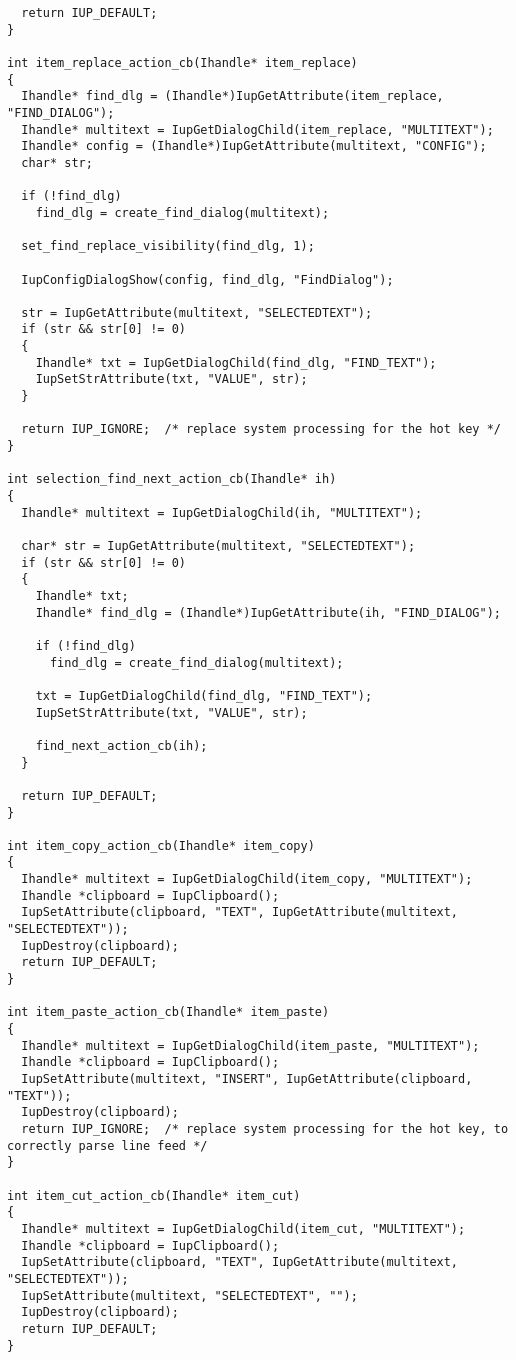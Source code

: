 \documentclass{ctexart}
\begin{document}
\begin{lstlisting}
  return IUP_DEFAULT;
}

int item_replace_action_cb(Ihandle* item_replace)
{
  Ihandle* find_dlg = (Ihandle*)IupGetAttribute(item_replace, "FIND_DIALOG");
  Ihandle* multitext = IupGetDialogChild(item_replace, "MULTITEXT");
  Ihandle* config = (Ihandle*)IupGetAttribute(multitext, "CONFIG");
  char* str;

  if (!find_dlg)
    find_dlg = create_find_dialog(multitext);

  set_find_replace_visibility(find_dlg, 1);

  IupConfigDialogShow(config, find_dlg, "FindDialog");

  str = IupGetAttribute(multitext, "SELECTEDTEXT");
  if (str && str[0] != 0)
  {
    Ihandle* txt = IupGetDialogChild(find_dlg, "FIND_TEXT");
    IupSetStrAttribute(txt, "VALUE", str);
  }

  return IUP_IGNORE;  /* replace system processing for the hot key */
}

int selection_find_next_action_cb(Ihandle* ih)
{
  Ihandle* multitext = IupGetDialogChild(ih, "MULTITEXT");

  char* str = IupGetAttribute(multitext, "SELECTEDTEXT");
  if (str && str[0] != 0)
  {
    Ihandle* txt;
    Ihandle* find_dlg = (Ihandle*)IupGetAttribute(ih, "FIND_DIALOG");

    if (!find_dlg)
      find_dlg = create_find_dialog(multitext);

    txt = IupGetDialogChild(find_dlg, "FIND_TEXT");
    IupSetStrAttribute(txt, "VALUE", str);

    find_next_action_cb(ih);
  }

  return IUP_DEFAULT;
}

int item_copy_action_cb(Ihandle* item_copy)
{
  Ihandle* multitext = IupGetDialogChild(item_copy, "MULTITEXT");
  Ihandle *clipboard = IupClipboard();
  IupSetAttribute(clipboard, "TEXT", IupGetAttribute(multitext, "SELECTEDTEXT"));
  IupDestroy(clipboard);
  return IUP_DEFAULT;
}

int item_paste_action_cb(Ihandle* item_paste)
{
  Ihandle* multitext = IupGetDialogChild(item_paste, "MULTITEXT");
  Ihandle *clipboard = IupClipboard();
  IupSetAttribute(multitext, "INSERT", IupGetAttribute(clipboard, "TEXT"));
  IupDestroy(clipboard);
  return IUP_IGNORE;  /* replace system processing for the hot key, to correctly parse line feed */
}

int item_cut_action_cb(Ihandle* item_cut)
{
  Ihandle* multitext = IupGetDialogChild(item_cut, "MULTITEXT");
  Ihandle *clipboard = IupClipboard();
  IupSetAttribute(clipboard, "TEXT", IupGetAttribute(multitext, "SELECTEDTEXT"));
  IupSetAttribute(multitext, "SELECTEDTEXT", "");
  IupDestroy(clipboard);
  return IUP_DEFAULT;
}


\end{lstlisting}
\end{document}
